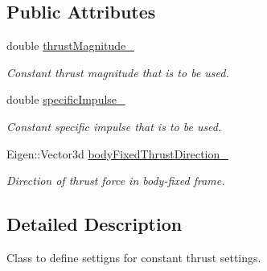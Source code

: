 \subsection*{Public Attributes}
\begin{DoxyCompactItemize}
\item 
double \hyperlink{classtudat_1_1simulation__setup_1_1ConstantThrustEngineSettings_af16b6213e164f7ee947684b19ca3e45f}{thrust\+Magnitude\+\_\+}\hypertarget{classtudat_1_1simulation__setup_1_1ConstantThrustEngineSettings_af16b6213e164f7ee947684b19ca3e45f}{}\label{classtudat_1_1simulation__setup_1_1ConstantThrustEngineSettings_af16b6213e164f7ee947684b19ca3e45f}

\begin{DoxyCompactList}\small\item\em Constant thrust magnitude that is to be used. \end{DoxyCompactList}\item 
double \hyperlink{classtudat_1_1simulation__setup_1_1ConstantThrustEngineSettings_a8d742f0d8101435059d43527da80e1be}{specific\+Impulse\+\_\+}\hypertarget{classtudat_1_1simulation__setup_1_1ConstantThrustEngineSettings_a8d742f0d8101435059d43527da80e1be}{}\label{classtudat_1_1simulation__setup_1_1ConstantThrustEngineSettings_a8d742f0d8101435059d43527da80e1be}

\begin{DoxyCompactList}\small\item\em Constant specific impulse that is to be used. \end{DoxyCompactList}\item 
Eigen\+::\+Vector3d \hyperlink{classtudat_1_1simulation__setup_1_1ConstantThrustEngineSettings_a106c13c84a319598328bd35ccb5e355e}{body\+Fixed\+Thrust\+Direction\+\_\+}\hypertarget{classtudat_1_1simulation__setup_1_1ConstantThrustEngineSettings_a106c13c84a319598328bd35ccb5e355e}{}\label{classtudat_1_1simulation__setup_1_1ConstantThrustEngineSettings_a106c13c84a319598328bd35ccb5e355e}

\begin{DoxyCompactList}\small\item\em Direction of thrust force in body-\/fixed frame. \end{DoxyCompactList}\end{DoxyCompactItemize}


\subsection{Detailed Description}
Class to define settigns for constant thrust settings. 

